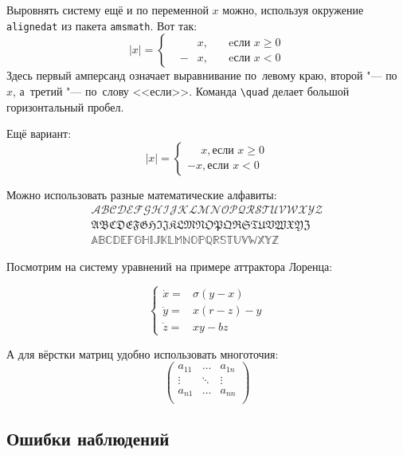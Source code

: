 Выровнять систему ещё и по переменной $ x $ можно, используя окружение \verb|alignedat| из пакета \verb|amsmath|. Вот так: 
\[
    |x| = \left\{
    \begin{alignedat}{2}
        &&x, \quad &\text{eсли } x\geqslant 0 \\
        &-&x, \quad & \text{eсли } x<0
    \end{alignedat}
    \right.
\]
Здесь первый амперсанд  означает выравнивание по~левому краю, второй "--- по~$ x $, а~третий "--- по~слову <<если>>. Команда \verb|\quad| делает большой горизонтальный пробел. 

Ещё вариант:
\[
    |x|=
    \begin{cases}
    \phantom{-}x, \text{если } x \geqslant 0 \\
    -x, \text{если } x<0
    \end{cases}
\]

Можно использовать разные математические алфавиты:
\begin{align}
\mathcal{ABCDEFGHIJKLMNOPQRSTUVWXYZ} \nonumber \\
\mathfrak{ABCDEFGHIJKLMNOPQRSTUVWXYZ} \nonumber \\
\mathbb{ABCDEFGHIJKLMNOPQRSTUVWXYZ} \nonumber
\end{align}

Посмотрим на систему уравнений на примере аттрактора Лоренца:

\[ 
\left\{
  \begin{array}{rl}
    \dot x = & \sigma (y-x) \\
    \dot y = & x (r - z) - y \\
    \dot z = & xy - bz
  \end{array}
\right.
\]

А для вёрстки матриц удобно использовать многоточия:
\[ 
\left(
  \begin{array}{ccc}
  	a_{11} & \ldots & a_{1n} \\
  	\vdots & \ddots & \vdots \\
  	a_{n1} & \ldots & a_{nn} \\
  \end{array}
\right)
\]


\subsection{Ошибки наблюдений} \label{subsect1_4_3}

